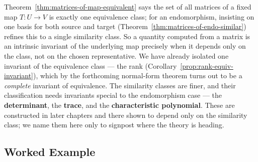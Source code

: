 \begin{remark}
\label{rem:basis-free-content}
    Theorem~\ref{thm:matrices-of-map-equivalent} says the set of all matrices of a fixed map $T : U \to V$
    is exactly one equivalence class; for an endomorphism, insisting on one basis for both source and
    target (Theorem~\ref{thm:matrices-of-endo-similar}) refines this to a single similarity class. So a
    quantity computed from a matrix is an intrinsic invariant of the underlying map precisely when it
    depends only on the class, not on the chosen representative. We have already isolated one invariant
    of the equivalence class --- the rank (Corollary~\ref{prop:rank-equiv-invariant}), which by the
    forthcoming normal-form theorem turns out to be a \emph{complete} invariant of equivalence. The
    similarity classes are finer, and their classification needs invariants special to the endomorphism
    case --- the \textbf{determinant}, the \textbf{trace}, and the \textbf{characteristic polynomial}.
    These are constructed in later chapters and there shown to depend only on the similarity class; we
    name them here only to signpost where the theory is heading.
\end{remark}

\subsection{Worked Example}

